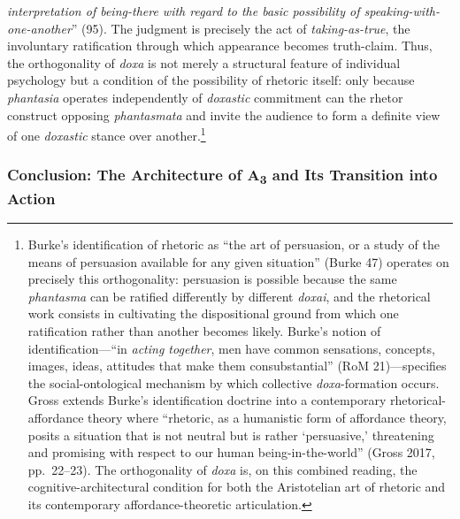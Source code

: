 \documentclass{article}
\begin{document}
\textit{interpretation of being-there with regard to the basic possibility of speaking-with-one-another}'' (95). The judgment is precisely the act of \textit{taking-as-true}, the involuntary ratification through which appearance becomes truth-claim. Thus, the orthogonality of \textit{doxa} is not merely a structural feature of individual psychology but a condition of the possibility of rhetoric itself: only because \textit{phantasia} operates independently of \textit{doxastic} commitment can the rhetor construct opposing \textit{phantasmata} and invite the audience to form a definite view of one \textit{doxastic} stance over another.\footnote{Burke's identification of rhetoric as ``the art of persuasion, or a study of the means of persuasion available for any given situation'' (Burke 47) operates on precisely this orthogonality: persuasion is possible because the same \textit{phantasma} can be ratified differently by different \textit{doxai}, and the rhetorical work consists in cultivating the dispositional ground from which one ratification rather than another becomes likely. Burke's notion of identification---``in \textit{acting together}, men have common sensations, concepts, images, ideas, attitudes that make them consubstantial'' (RoM 21)---specifies the social-ontological mechanism by which collective \textit{doxa}-formation occurs. Gross extends Burke's identification doctrine into a contemporary rhetorical-affordance theory where ``rhetoric, as a humanistic form of affordance theory, posits a situation that is not neutral but is rather `persuasive,' threatening and promising with respect to our human being-in-the-world'' (Gross 2017, pp.~22--23). The orthogonality of \textit{doxa} is, on this combined reading, the cognitive-architectural condition for both the Aristotelian art of rhetoric and its contemporary affordance-theoretic articulation.}

\subsubsection*{Conclusion: The Architecture of A\textsubscript{3} and Its Transition into Action}
\end{document}
